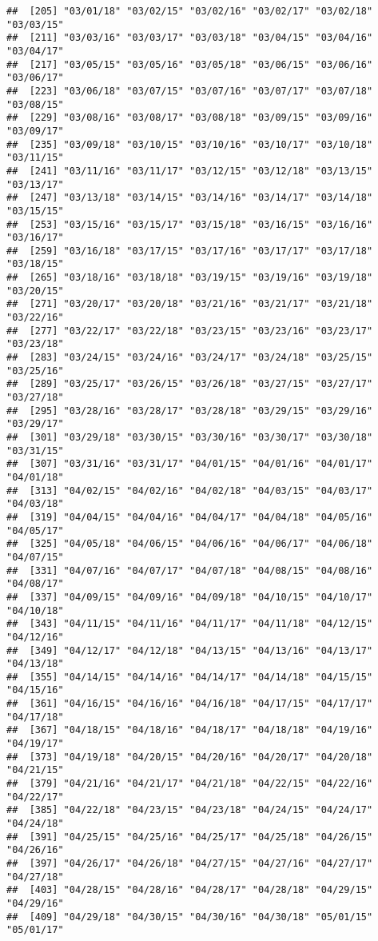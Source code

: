 \documentclass[]{article}
\begin{document}
\begin{verbatim}
##  [205] "03/01/18" "03/02/15" "03/02/16" "03/02/17" "03/02/18" "03/03/15"
##  [211] "03/03/16" "03/03/17" "03/03/18" "03/04/15" "03/04/16" "03/04/17"
##  [217] "03/05/15" "03/05/16" "03/05/18" "03/06/15" "03/06/16" "03/06/17"
##  [223] "03/06/18" "03/07/15" "03/07/16" "03/07/17" "03/07/18" "03/08/15"
##  [229] "03/08/16" "03/08/17" "03/08/18" "03/09/15" "03/09/16" "03/09/17"
##  [235] "03/09/18" "03/10/15" "03/10/16" "03/10/17" "03/10/18" "03/11/15"
##  [241] "03/11/16" "03/11/17" "03/12/15" "03/12/18" "03/13/15" "03/13/17"
##  [247] "03/13/18" "03/14/15" "03/14/16" "03/14/17" "03/14/18" "03/15/15"
##  [253] "03/15/16" "03/15/17" "03/15/18" "03/16/15" "03/16/16" "03/16/17"
##  [259] "03/16/18" "03/17/15" "03/17/16" "03/17/17" "03/17/18" "03/18/15"
##  [265] "03/18/16" "03/18/18" "03/19/15" "03/19/16" "03/19/18" "03/20/15"
##  [271] "03/20/17" "03/20/18" "03/21/16" "03/21/17" "03/21/18" "03/22/16"
##  [277] "03/22/17" "03/22/18" "03/23/15" "03/23/16" "03/23/17" "03/23/18"
##  [283] "03/24/15" "03/24/16" "03/24/17" "03/24/18" "03/25/15" "03/25/16"
##  [289] "03/25/17" "03/26/15" "03/26/18" "03/27/15" "03/27/17" "03/27/18"
##  [295] "03/28/16" "03/28/17" "03/28/18" "03/29/15" "03/29/16" "03/29/17"
##  [301] "03/29/18" "03/30/15" "03/30/16" "03/30/17" "03/30/18" "03/31/15"
##  [307] "03/31/16" "03/31/17" "04/01/15" "04/01/16" "04/01/17" "04/01/18"
##  [313] "04/02/15" "04/02/16" "04/02/18" "04/03/15" "04/03/17" "04/03/18"
##  [319] "04/04/15" "04/04/16" "04/04/17" "04/04/18" "04/05/16" "04/05/17"
##  [325] "04/05/18" "04/06/15" "04/06/16" "04/06/17" "04/06/18" "04/07/15"
##  [331] "04/07/16" "04/07/17" "04/07/18" "04/08/15" "04/08/16" "04/08/17"
##  [337] "04/09/15" "04/09/16" "04/09/18" "04/10/15" "04/10/17" "04/10/18"
##  [343] "04/11/15" "04/11/16" "04/11/17" "04/11/18" "04/12/15" "04/12/16"
##  [349] "04/12/17" "04/12/18" "04/13/15" "04/13/16" "04/13/17" "04/13/18"
##  [355] "04/14/15" "04/14/16" "04/14/17" "04/14/18" "04/15/15" "04/15/16"
##  [361] "04/16/15" "04/16/16" "04/16/18" "04/17/15" "04/17/17" "04/17/18"
##  [367] "04/18/15" "04/18/16" "04/18/17" "04/18/18" "04/19/16" "04/19/17"
##  [373] "04/19/18" "04/20/15" "04/20/16" "04/20/17" "04/20/18" "04/21/15"
##  [379] "04/21/16" "04/21/17" "04/21/18" "04/22/15" "04/22/16" "04/22/17"
##  [385] "04/22/18" "04/23/15" "04/23/18" "04/24/15" "04/24/17" "04/24/18"
##  [391] "04/25/15" "04/25/16" "04/25/17" "04/25/18" "04/26/15" "04/26/16"
##  [397] "04/26/17" "04/26/18" "04/27/15" "04/27/16" "04/27/17" "04/27/18"
##  [403] "04/28/15" "04/28/16" "04/28/17" "04/28/18" "04/29/15" "04/29/16"
##  [409] "04/29/18" "04/30/15" "04/30/16" "04/30/18" "05/01/15" "05/01/17"

\end{verbatim}
\end{document}
